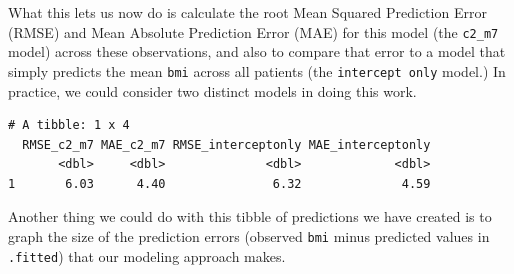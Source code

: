 \documentclass[]{book}
\newenvironment{Shaded}{\begin{snugshade}}{\end{snugshade}}
\newcommand{\KeywordTok}[1]{\textcolor[rgb]{0.13,0.29,0.53}{\textbf{#1}}}
\newcommand{\DataTypeTok}[1]{\textcolor[rgb]{0.13,0.29,0.53}{#1}}
\newcommand{\DecValTok}[1]{\textcolor[rgb]{0.00,0.00,0.81}{#1}}
\newcommand{\StringTok}[1]{\textcolor[rgb]{0.31,0.60,0.02}{#1}}
\newcommand{\OperatorTok}[1]{\textcolor[rgb]{0.81,0.36,0.00}{\textbf{#1}}}
\newcommand{\NormalTok}[1]{#1}
\theoremstyle{definition}
\theoremstyle{definition}
\theoremstyle{definition}
\theoremstyle{remark}
\begin{document}
What this lets us now do is calculate the root Mean Squared Prediction
Error (RMSE) and Mean Absolute Prediction Error (MAE) for this model
(the \texttt{c2\_m7} model) across these observations, and also to
compare that error to a model that simply predicts the mean \texttt{bmi}
across all patients (the \texttt{intercept\ only} model.) In practice,
we could consider two distinct models in doing this work.

\begin{Shaded}
\end{Shaded}

\begin{verbatim}
# A tibble: 1 x 4
  RMSE_c2_m7 MAE_c2_m7 RMSE_interceptonly MAE_interceptonly
       <dbl>     <dbl>              <dbl>             <dbl>
1       6.03      4.40               6.32              4.59
\end{verbatim}

Another thing we could do with this tibble of predictions we have
created is to graph the size of the prediction errors (observed
\texttt{bmi} minus predicted values in \texttt{.fitted}) that our
modeling approach makes.
\end{document}

